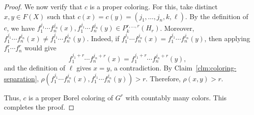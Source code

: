 \documentclass[10pt,a4paper]{amsart}
\begin{document}
\begin{proof}
We now verify that $c$ is a proper coloring. For this, take distinct $x,y\in F(X)$ such that
$c(x)=c(y)=(j_1,\ldots,j_n,k,\ell)$.
By the definition of $c$, we have
$f_1^{j_1}\cdots f_n^{j_n}(x),f_1^{j_1}\cdots f_n^{j_n}(y)\in P_k^{r,\ldots,r}(H_r)$.
Moreover, $f_1^{j_1}\cdots f_n^{j_n}(x)\ne f_1^{j_1}\cdots f_n^{j_n}(y)$. Indeed, if $f_1^{j_1}\cdots f_n^{j_n}(x)=f_1^{j_1}\cdots f_n^{j_n}(y)$, then applying
$f_1^r\cdots f_n^r$ would give
$$
f_1^{j_1+r}\cdots f_n^{j_n+r}(x)
=
f_1^{j_1+r}\cdots f_n^{j_n+r}(y),
$$
and the definition of $\ell$ gives $x=y$,
a contradiction. By Claim~\ref{clm:coloring-separation},
$\rho(f_1^{j_1}\cdots f_n^{j_n}(x),f_1^{j_1}\cdots f_n^{j_n}(y))>r$.
Therefore,
$\rho(x,y)>r$.

Thus, $c$ is a proper Borel coloring of $G^r$ with countably many colors. This completes the proof.
\end{proof}
\end{document}
